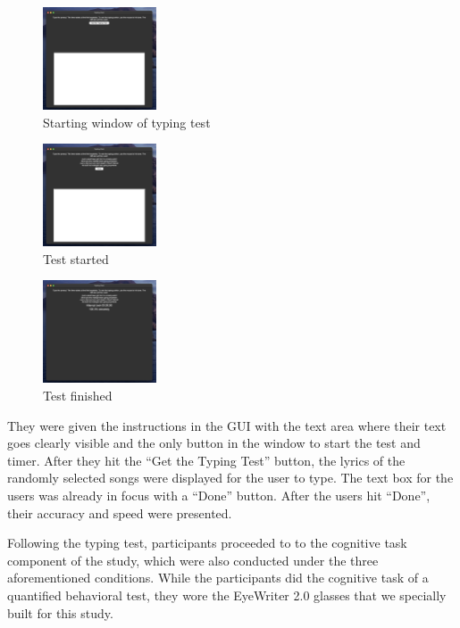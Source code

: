 \documentclass[sigconf]{acmart}
\begin{document}
  \begin{figure}
    \includegraphics[width=0.3\textwidth]{typing_test_1}
    \caption{Starting window of typing test}
  \end{figure}

  \begin{figure}
    \includegraphics[width=0.3\textwidth]{typing_test_2}
    \caption{Test started}
  \end{figure}

  \begin{figure}
    \includegraphics[width=0.3\textwidth]{typing_test_3}
    \caption{Test finished}
  \end{figure}

  They were given the instructions in the GUI with the text area where their text goes clearly visible and the only button in the window to start the test and timer. After they hit the ``Get the Typing Test'' button, the lyrics of the randomly selected songs were displayed for the user to type. The text box for the users was already in focus with a ``Done'' button. After the users hit ``Done'', their accuracy and speed were presented.

  Following the typing test, participants proceeded to to the cognitive task component of the study, which were also conducted under the three aforementioned conditions. While the participants did the cognitive task of a quantified behavioral test, they wore the EyeWriter 2.0 glasses that we specially built for this study.
\end{document}
